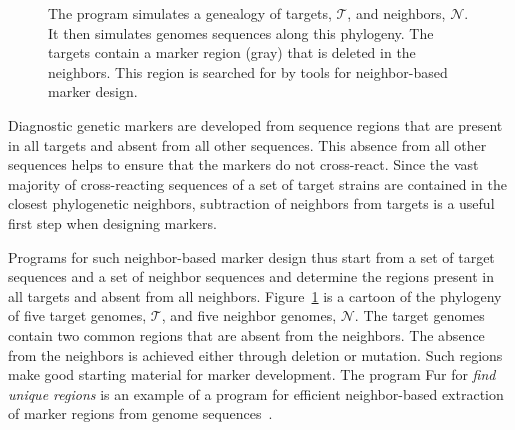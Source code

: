 \begin{figure}[ht]
  \begin{center}
    
\hspace{-2.8cm}
\end{center}
\caption{The program  simulates a genealogy of targets,
  $\mathcal{T}$, and neighbors, $\mathcal{N}$. It then simulates
  genomes sequences along this phylogeny. The targets contain a marker
  region (gray) that is deleted in the neighbors. This region is
  searched for by tools for neighbor-based marker
  design.}\label{fig:tn}
\end{figure}

Diagnostic genetic markers are developed from sequence regions that
are present in all targets and absent from all other sequences. This
absence from all other sequences helps to ensure that the markers do
not cross-react. Since the vast majority of cross-reacting sequences
of a set of target strains are contained in the closest phylogenetic
neighbors, subtraction of neighbors from targets is a useful first
step when designing markers.

Programs for such neighbor-based marker design thus start from a set
of target sequences and a set of neighbor sequences and determine the
regions present in all targets and absent from all
neighbors. Figure~\ref{fig:tn} is a cartoon of the phylogeny of five
target genomes, $\mathcal{T}$, and five neighbor genomes,
$\mathcal{N}$. The target genomes contain two common regions that are
absent from the neighbors. The absence from the neighbors is achieved
either through deletion or mutation. Such regions make good starting
material for marker development. The program Fur for \emph{find unique
regions} is an example of a program for efficient neighbor-based
extraction of marker regions from genome
sequences~\cite{hau21:fur}.

